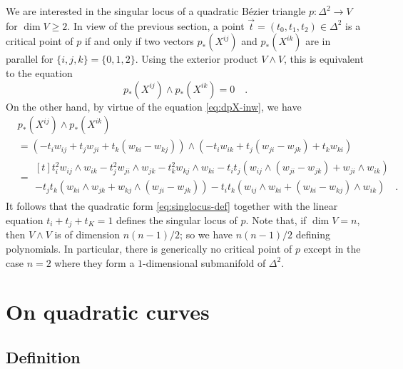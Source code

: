 \documentclass[pdftex,a4paper,12pt]{scrartcl}
\theoremstyle{plain}
\theoremstyle{definition}
\theoremstyle{remark}
\numberwithin{equation}{section}
\begin{document}
We are interested in the singular locus of a quadratic B\'ezier triangle $p:\Delta^2\to V$ for $\dim V\ge 2$.
In view of the previous section, a point $\vec t=(t_0,t_1,t_2)\in\Delta^2$ is a critical point of $p$ if and only if two vectors $p_\ast(X^{ij})$ and $p_\ast(X^{ik})$ are in parallel for $\{i,j,k\}=\{0,1,2\}$.
Using the exterior product $V\wedge V$, this is equivalent to the equation
\[
p_\ast(X^{ij})\wedge p_\ast(X^{ik})=0
\quad.
\]
On the other hand, by virtue of the equation \eqref{eq:dpX-inw}, we have
\begin{equation}
\label{eq:singlocus-def}
\begin{split}
& p_\ast(X^{ij})\wedge p_\ast(X^{ik}) \\
&= \left(-t_iw_{ij}+t_jw_{ji}+t_k(w_{ki}-w_{kj})\right)\wedge\left(-t_iw_{ik}+t_j(w_{ji}-w_{jk})+t_kw_{ki}\right) \\
&=
\begin{multlined}[t]
t_i^2 w_{ij}\wedge w_{ik}-t_j^2w_{ji}\wedge w_{jk}-t_k^2w_{kj}\wedge w_{ki}
- t_it_j\left(w_{ij}\wedge(w_{ji}-w_{jk})+w_{ji}\wedge w_{ik}\right) \\
- t_jt_k\left(w_{ki}\wedge w_{jk}+w_{kj}\wedge(w_{ji}-w_{jk})\right)
- t_it_k\left(w_{ij}\wedge w_{ki}+(w_{ki}-w_{kj})\wedge w_{ik}\right)
\quad.
\end{multlined}
\end{split}
\end{equation}
It follows that the quadratic form \eqref{eq:singlocus-def} together with the linear equation $t_i+t_j+t_K=1$ defines the singular locus of $p$.
Note that, if $\dim V=n$, then $V\wedge V$ is of dimension $n(n-1)/2$; so we have $n(n-1)/2$ defining polynomials.
In particular, there is generically no critical point of $p$ except in the case $n=2$ where they form a $1$-dimensional submanifold of $\Delta^2$.


\section{On quadratic curves}

\subsection{Definition}
\end{document}
